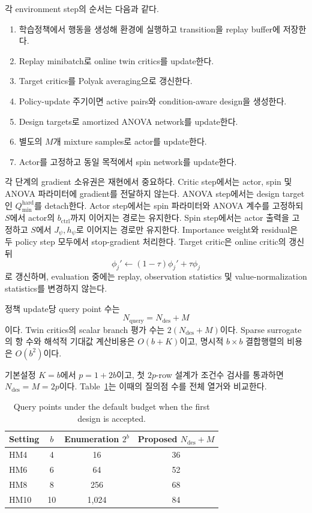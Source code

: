 \documentclass[10pt,journal]{IEEEtran}
\begin{document}
각 environment step의 순서는 다음과 같다.
\begin{enumerate}
    \item 학습정책에서 행동을 생성해 환경에 실행하고 transition을 replay buffer에 저장한다.
    \item Replay minibatch로 online twin critics를 update한다.
    \item Target critics를 Polyak averaging으로 갱신한다.
    \item Policy-update 주기이면 active pairs와 condition-aware design을 생성한다.
    \item Design targets로 amortized ANOVA network를 update한다.
    \item 별도의 $M$개 mixture samples로 actor를 update한다.
    \item Actor를 고정하고 동일 목적에서 spin network를 update한다.
\end{enumerate}

각 단계의 gradient 소유권은 재현에서 중요하다. Critic step에서는 actor, spin 및 ANOVA 파라미터에 gradient를 전달하지 않는다. ANOVA step에서는 design target인 $Q_{\min}^{\mathrm{hard}}$를 detach한다. Actor step에서는 spin 파라미터와 ANOVA 계수를 고정하되 $S$에서 actor의 $b_{\mathrm{ctrl}}$까지 이어지는 경로는 유지한다. Spin step에서는 actor 출력을 고정하고 $S$에서 $J_\psi,h_\psi$로 이어지는 경로만 유지한다. Importance weight와 residual은 두 policy step 모두에서 stop-gradient 처리한다. Target critic은 online critic의 갱신 뒤
\begin{equation}
\phi_j'\leftarrow(1-\tau)\phi_j'+\tau\phi_j
\end{equation}
로 갱신하며, evaluation 중에는 replay, observation statistics 및 value-normalization statistics를 변경하지 않는다.

정책 update당 query point 수는
\begin{equation}
N_{\mathrm{query}}=N_{\mathrm{des}}+M
\end{equation}
이다. Twin critics의 scalar branch 평가 수는 $2(N_{\mathrm{des}}+M)$이다. Sparse surrogate의 항 수와 해석적 기대값 계산비용은 $O(b+K)$이고, 명시적 $b\times b$ 결합행렬의 비용은 $O(b^2)$이다.

기본설정 $K=b$에서 $p=1+2b$이고, 첫 $2p$-row 설계가 조건수 검사를 통과하면 $N_{\mathrm{des}}=M=2p$이다. Table~\ref{tab:supp-query-crossover}는 이때의 질의점 수를 전체 열거와 비교한다.

\begin{table}[!t]
\centering
\caption{Query points under the default budget when the first design is accepted.}
\label{tab:supp-query-crossover}
\begin{tabular}{lccc}
\toprule
Setting & $b$ & Enumeration $2^b$ & Proposed $N_{\mathrm{des}}+M$ \\
\midrule
HM4 & 4 & 16 & 36 \\
HM6 & 6 & 64 & 52 \\
HM8 & 8 & 256 & 68 \\
HM10 & 10 & 1,024 & 84 \\
\bottomrule
\end{tabular}
\end{table}
\end{document}
